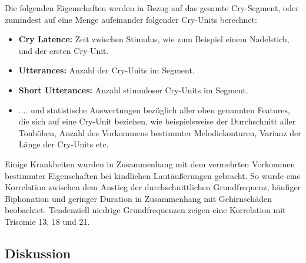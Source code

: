 Die folgenden Eigenschaften werden in Bezug auf das gesamte Cry-Segment, oder zumindest auf eine Menge aufeinander folgender Cry-Units berechnet:

\begin{itemize}
	\item \textbf{Cry Latence: } Zeit zwischen Stimulus, wie zum Beispiel einem Nadelstich, und der ersten Cry-Unit.
	\item \textbf{Utterances: } Anzahl der Cry-Units im Segment.
	\item \textbf{Short Utterances: } Anzahl stimmloser Cry-Units im Segment.
	\item .... und statistische Auswertungen bezüglich aller oben genannten Features, die sich auf eine Cry-Unit beziehen, wie beispielsweise der Durchschnitt aller Tonhöhen, Anzahl des Vorkommens bestimmter Melodiekonturen, Varianz der Länge der Cry-Units etc.\cite[S. 85]{parentalPerception}
\end{itemize}

Einige Krankheiten wurden in Zusammenhang mit dem vermehrten Vorkommen bestimmter Eigenschaften bei kindlichen Lautäußerungen gebracht. So wurde eine Korrelation zwischen dem Anstieg der durchschnittlichen Grundfrequenz, häufiger Biphonation und geringer Duration in Zusammenhang mit Gehirnschäden beobachtet. Tendenziell niedrige Grundfrequenzen zeigen eine Korrelation mit Trisomie 13, 18 und 21.\cite[S. 85]{parentalPerception}

\subsection{Diskussion}
\label{sec:cryDiscussion}

